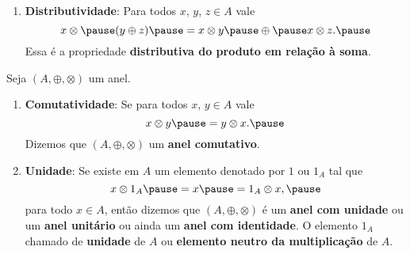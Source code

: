 \documentclass{beamer}
\begin{document}
    \begin{frame}
        \begin{definicao}
            \begin{enumerate}[label={\roman*})]
                \conti

                \item \textbf{Distributividade}: \pause Para todos $x$, \pause $y$, \pause $z \in A$ \pause vale\pause
                \[
                    x \otimes \pause (y \oplus z) \pause = x \otimes y \pause \oplus \pause x\otimes z.\pause
                \]
                Essa {\'e} a propriedade \textbf{distributiva do produto em rela{\c c}{\~a}o {\`a} soma}.
            \end{enumerate}
        \end{definicao}
    \end{frame}

    \begin{frame}
        \begin{observacoes}
            Seja $(A, \oplus, \otimes)$ \pause um anel.\pause
            \begin{enumerate}[label={\arabic*})]
                \item \textbf{Comutatividade}: Se para todos $x$, \pause $y \in A$ \pause vale
                \[
                    x \otimes y \pause = y \otimes x.\pause
                \]
                Dizemos que $(A, \oplus, \otimes)$  um \textbf{anel comutativo}.\pause

                \vspace{.7cm}

                \item \textbf{Unidade}: \pause Se existe em $A$ \pause um elemento denotado por $1$ \pause ou $1_{A}$
                    \pause tal que\pause
                \[
                    x \otimes 1_A \pause = x \pause = 1_A \otimes x,\pause
                \]
                para todo $x \in A$, \pause ent{\~a}o dizemos que $(A, \oplus, \otimes)$ \pause \'e um \textbf{anel com
                unidade} \pause ou um \textbf{anel unit{\'a}rio} ou ainda um \textbf{anel com identidade}. \pause O
                elemento $1_A$  chamado de \textbf{unidade} de $A$ \pause ou \textbf{elemento neutro da
                multiplica\c{c}\~ao} \pause de $A$.

                \vspace{.7cm}

                \seti
             \end{enumerate}
        \end{observacoes}
    \end{frame}
\end{document}
